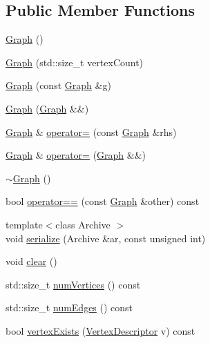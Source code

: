 \subsection*{Public Member Functions}
\begin{DoxyCompactItemize}
\item 
\hyperlink{classpan_1_1detail_1_1_graph_a162f4615aa554b1455e54234108da5e6}{Graph} ()
\item 
\hyperlink{classpan_1_1detail_1_1_graph_ac4d4d53acd9e6637ade9c3f026fd63d6}{Graph} (std\+::size\+\_\+t vertex\+Count)
\item 
\hyperlink{classpan_1_1detail_1_1_graph_a33d07cc94ec5936885da57f01e151253}{Graph} (const \hyperlink{classpan_1_1detail_1_1_graph}{Graph} \&g)
\item 
\hyperlink{classpan_1_1detail_1_1_graph_a5103d7c5ead98cac2306d1c3ca482e8e}{Graph} (\hyperlink{classpan_1_1detail_1_1_graph}{Graph} \&\&)
\item 
\hyperlink{classpan_1_1detail_1_1_graph}{Graph} \& \hyperlink{classpan_1_1detail_1_1_graph_aed16e054462d1f7d7d063e3be862a11a}{operator=} (const \hyperlink{classpan_1_1detail_1_1_graph}{Graph} \&rhs)
\item 
\hyperlink{classpan_1_1detail_1_1_graph}{Graph} \& \hyperlink{classpan_1_1detail_1_1_graph_a620d5389f1c950b960ce9b9053bed628}{operator=} (\hyperlink{classpan_1_1detail_1_1_graph}{Graph} \&\&)
\item 
\hyperlink{classpan_1_1detail_1_1_graph_a08789a6050c651e8ff2f99a390f5ad31}{$\sim$\+Graph} ()
\item 
bool \hyperlink{classpan_1_1detail_1_1_graph_abfeef8f9146709aae343974ae595f080}{operator==} (const \hyperlink{classpan_1_1detail_1_1_graph}{Graph} \&other) const
\item 
{\footnotesize template$<$class Archive $>$ }\\void \hyperlink{classpan_1_1detail_1_1_graph_aefa6b97b33eae8917b3d48820a2cf519}{serialize} (Archive \&ar, const unsigned int)
\item 
void \hyperlink{classpan_1_1detail_1_1_graph_ac24a809b242786e3b5e32fe55227b4e3}{clear} ()
\item 
std\+::size\+\_\+t \hyperlink{classpan_1_1detail_1_1_graph_acf43df485b16aa0eb0f22f1ce30dffaf}{num\+Vertices} () const
\item 
std\+::size\+\_\+t \hyperlink{classpan_1_1detail_1_1_graph_a0be37954bf6f8c814b3e9ba7b1727995}{num\+Edges} () const
\item 
bool \hyperlink{classpan_1_1detail_1_1_graph_ad46610d729b56f7f899458cc5021c0f3}{vertex\+Exists} (\hyperlink{classpan_1_1detail_1_1_graph_a462f566d2f6cb0e51c85c8e9fa5382ab}{Vertex\+Descriptor} v) const

\end{DoxyCompactItemize}
